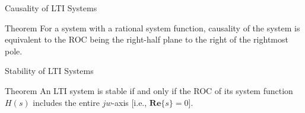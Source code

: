 \documentclass[aspectratio=169]{beamer}
\begin{document}
\begin{frame}{Causality of LTI Systems}
\begin{block}{Theorem}
	For a system with a rational system function, causality
of the system is equivalent to the ROC being the
right-half plane to the right of the rightmost pole.
	
\end{block}
\end{frame}


\begin{frame}{Stability of LTI Systems}
\begin{block}{Theorem}
	An LTI system is stable if and only if the ROC
of its system function $ H(s) $ includes the entire
$ jw $-axis [i.e., $ \mathbf{Re}\{s\} = 0 $].
\end{block}
\end{frame}
\end{document}
